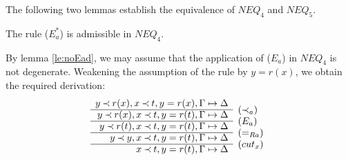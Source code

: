 The following two lemmas establish the equivalence of
  $NEQ_4$ and $NEQ_5$.

\begin{LEMMA}\label{le:Ea*}
The rule ($E_a^*$) is admissible in $NEQ_4$.
\end{LEMMA}
\begin{PROOF}
By lemma \ref{le:noEad}, we may assume that the application of ($E_a$) in
$NEQ_4$ is not degenerate.
Weakening the assumption of the rule by $y=r(x)$, we obtain the required
derivation:
\[ \begin{array}{rl}
 y\Incl r(x), x\Incl t, y=r(x), \GSD \\ \cline{1-1}
 y\Incl r(x), x\Incl t, y=r(t), \GSD & \rabove{(\Incl_a)} \\ \cline{1-1}
 y\Incl r(t), x\Incl t, y=r(t), \GSD & \rabove{(E_a)} \\ \cline{1-1}
 y\Incl y, x\Incl t, y=r(t), \GSD & \rabove{(=_{Ra})} \\ \cline{1-1}
 x\Incl t, y=r(t), \GSD & \rabove{(cut_x)} \end{array} \]
\end{PROOF}

